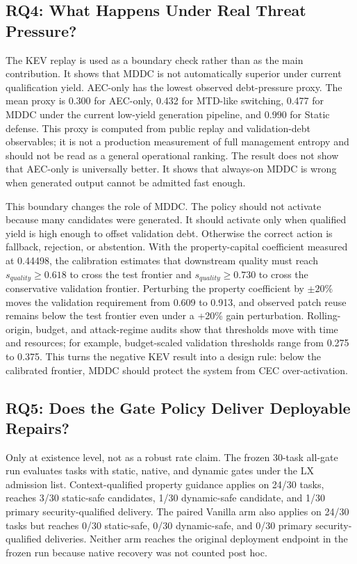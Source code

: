 ﻿\documentclass[lettersize,journal]{IEEEtran}
\begin{document}
\subsection{RQ4: What Happens Under Real Threat Pressure?}
The KEV replay is used as a boundary check rather than as the main contribution. It shows that MDDC is not automatically superior under current qualification yield. AEC-only has the lowest observed debt-pressure proxy. The mean proxy is 0.300 for AEC-only, 0.432 for MTD-like switching, 0.477 for MDDC under the current low-yield generation pipeline, and 0.990 for Static defense. This proxy is computed from public replay and validation-debt observables; it is not a production measurement of full management entropy and should not be read as a general operational ranking. The result does not show that AEC-only is universally better. It shows that always-on MDDC is wrong when generated output cannot be admitted fast enough.

This boundary changes the role of MDDC. The policy should not activate because many candidates were generated. It should activate only when qualified yield is high enough to offset validation debt. Otherwise the correct action is fallback, rejection, or abstention. With the property-capital coefficient measured at 0.44498, the calibration estimates that downstream quality must reach $s_{quality}\geq 0.618$ to cross the test frontier and $s_{quality}\geq 0.730$ to cross the conservative validation frontier. Perturbing the property coefficient by $\pm20\%$ moves the validation requirement from 0.609 to 0.913, and observed patch reuse remains below the test frontier even under a +20\% gain perturbation. Rolling-origin, budget, and attack-regime audits show that thresholds move with time and resources; for example, budget-scaled validation thresholds range from 0.275 to 0.375. This turns the negative KEV result into a design rule: below the calibrated frontier, MDDC should protect the system from CEC over-activation.

\subsection{RQ5: Does the Gate Policy Deliver Deployable Repairs?}
Only at existence level, not as a robust rate claim. The frozen 30-task all-gate run evaluates tasks with static, native, and dynamic gates under the LX admission list. Context-qualified property guidance applies on 24/30 tasks, reaches 3/30 static-safe candidates, 1/30 dynamic-safe candidate, and 1/30 primary security-qualified delivery. The paired Vanilla arm also applies on 24/30 tasks but reaches 0/30 static-safe, 0/30 dynamic-safe, and 0/30 primary security-qualified deliveries. Neither arm reaches the original deployment endpoint in the frozen run because native recovery was not counted post hoc.
\end{document}
